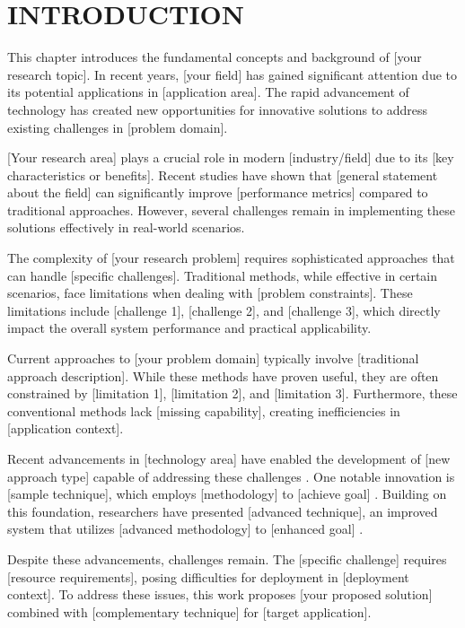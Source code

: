 \chapter{INTRODUCTION}

This chapter introduces the fundamental concepts and background of [your research topic]. In recent years, [your field] has gained significant attention due to its potential applications in [application area]. The rapid advancement of technology has created new opportunities for innovative solutions to address existing challenges in [problem domain].

[Your research area] plays a crucial role in modern [industry/field] due to its [key characteristics or benefits]. Recent studies have shown that [general statement about the field] can significantly improve [performance metrics] compared to traditional approaches. However, several challenges remain in implementing these solutions effectively in real-world scenarios.

The complexity of [your research problem] requires sophisticated approaches that can handle [specific challenges]. Traditional methods, while effective in certain scenarios, face limitations when dealing with [problem constraints]. These limitations include [challenge 1], [challenge 2], and [challenge 3], which directly impact the overall system performance and practical applicability.

Current approaches to [your problem domain] typically involve [traditional approach description]. While these methods have proven useful, they are often constrained by [limitation 1], [limitation 2], and [limitation 3]. Furthermore, these conventional methods lack [missing capability], creating inefficiencies in [application context].

Recent advancements in [technology area] have enabled the development of [new approach type] capable of addressing these challenges \cite{sample2020reference}. One notable innovation is [sample technique], which employs [methodology] to [achieve goal] \cite{sample2022reference}. Building on this foundation, researchers have presented [advanced technique], an improved system that utilizes [advanced methodology] to [enhanced goal] \cite{sample2023reference}.

Despite these advancements, challenges remain. The [specific challenge] requires [resource requirements], posing difficulties for deployment in [deployment context]. To address these issues, this work proposes [your proposed solution] combined with [complementary technique] for [target application].

